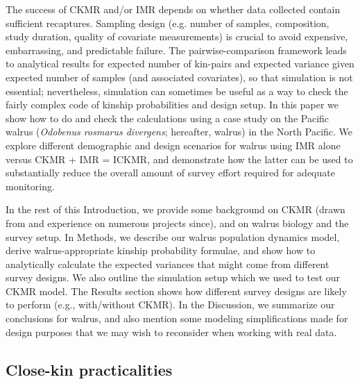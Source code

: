 The success of CKMR and/or IMR depends on whether data collected contain
sufficient recaptures. Sampling design (e.g. number of samples, composition,
study duration, quality of covariate measurements) is crucial to avoid
expensive, embarrassing, and predictable failure. The pairwise-comparison
framework leads to analytical results for expected number of kin-pairs
and expected variance given expected number of samples (and associated
covariates), so that simulation is not essential; nevertheless, simulation
can sometimes be useful as a way to check the fairly complex code
of kinship probabilities and design setup. In this paper we show how
to do and check the calculations using a case study on the Pacific
walrus (\emph{Odobenus rosmarus divergens}; hereafter, walrus) in
the North Pacific. We explore different demographic and design scenarios
for walrus using IMR alone versus CKMR + IMR = ICKMR, and demonstrate
how the latter can be used to substantially reduce the overall amount
of survey effort required for adequate monitoring.

In the rest of this Introduction, we provide some background on CKMR
(drawn from \citealt{bravington_close-kin_2016} and experience on
numerous projects since), and on walrus biology and the survey setup.
In Methods, we describe our walrus population dynamics model, derive
walrus-appropriate kinship probability formulae, and show how to analytically
calculate the expected variances that might come from different survey
designs. We also outline the simulation setup which we used to test
our CKMR model. The Results section shows how different survey designs
are likely to perform (e.g., with\slash without CKMR). In the Discussion,
we summarize our conclusions for walrus, and also mention some modeling
simplifications made for design purposes that we may wish to reconsider
when working with real data.

\subsection{Close-kin practicalities}

